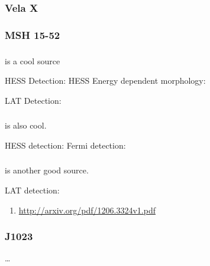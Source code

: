 \subsubsection{Vela X}

\subsubsection{MSH 15-52}


\subsubsection{}

 is a cool source

HESS Detection: 
HESS Energy dependent morphology: \cite{aharonian_2006a_energy-dependent}

LAT Detection: \cite{grondin_2011_detection-pulsar}



\subsubsection{}

 is also cool.

HESS detection:  \cite{aharonian_2006a_h.e.s.s.-survey}
Fermi detection: \cite{slane_2010_fermi-detection}

\subsubsection{}

 is another good source.

LAT detection: \cite{rousseau_2012_fermi-lat-constraints}

\begin{enumerate}
  \item \url{http://arxiv.org/pdf/1206.3324v1.pdf}
\end{enumerate}

\subsubsection{J1023}

\ldots
